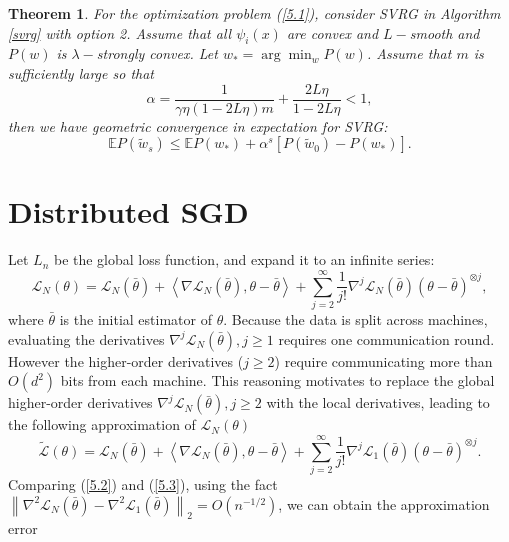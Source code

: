 \documentclass[12pt]{article}
\numberwithin{equation}{section}
\newtheorem{theorem}{Theorem}[section]
\begin{document}
\DecMargin{1em}
\begin{theorem}
	For the optimization problem (\ref{5.1}), consider SVRG in Algorithm \ref{svrg} with option 2. Assume that all $\psi_{i}(x)$ are convex and $L-$smooth and $P(w)$ is $\lambda-$strongly convex. Let $w_{*}=\arg \min _{w} P(w)$. Assume that $m$ is sufficiently large so that
	$$
	\alpha=\frac{1}{\gamma \eta(1-2 L \eta) m}+\frac{2 L \eta}{1-2 L \eta}<1,
	$$
	then we have geometric convergence in expectation for SVRG:
	$$
	\mathbb{E} P\left(\tilde{w}_{s}\right) \leq \mathbb{E} P\left(w_{*}\right)+\alpha^{s}\left[P\left(\tilde{w}_{0}\right)-P\left(w_{*}\right)\right].
	$$
\end{theorem}
\section{Distributed SGD}
Let $L_n$ be the global loss function, and expand it to an infinite series:
\begin{equation}\label{5.2}
\mathcal{L}_{N}(\theta)=\mathcal{L}_{N}(\bar{\theta})+\left\langle\nabla \mathcal{L}_{N}(\bar{\theta}), \theta-\bar{\theta}\right\rangle+\sum_{j=2}^{\infty} \frac{1}{j !} \nabla^{j} \mathcal{L}_{N}(\bar{\theta})(\theta-\bar{\theta})^{\otimes j},
\end{equation}
where $\bar{\theta}$ is the initial estimator of $\theta$. Because the data is split across machines, evaluating the derivatives $\nabla^{j} \mathcal{L}_{N}(\bar{\theta}), j\geq 1$ requires one communication round. However the higher-order derivatives ($j\geq 2$) require communicating more than $O(d^2)$ bits from each machine. This reasoning motivates \citet*{jordan2019communication} to replace the global higher-order derivatives $\nabla^{j} \mathcal{L}_{N}(\bar{\theta}), j\geq 2$ with the local derivatives, leading to the following approximation of $\mathcal{L}_{N}(\theta)$
\begin{equation}\label{5.3}
\widetilde{\mathcal{L}}(\theta)=\mathcal{L}_{N}(\bar{\theta})+\left\langle\nabla \mathcal{L}_{N}(\bar{\theta}), \theta-\bar{\theta}\right\rangle+\sum_{j=2}^{\infty} \frac{1}{j !} \nabla^{j} \mathcal{L}_{1}(\bar{\theta})(\theta-\bar{\theta})^{\otimes j}.
\end{equation}
Comparing (\ref{5.2}) and (\ref{5.3}), using the fact $\left\|\nabla^{2} \mathcal{L}_{N}(\bar{\theta})-\nabla^{2} \mathcal{L}_{1}(\bar{\theta})\right\|_{2}=O\left(n^{-1 / 2}\right)$, we can obtain the approximation error
\end{document}
